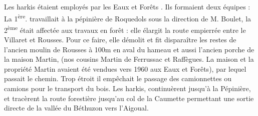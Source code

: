 Les harkis étaient employés par les \og Eaux et Forêts \fg{}. Ils formaient deux équipes :
La 1\textsuperscript{ère}. travaillait à la pépinière de Roquedols sous la direction de M. Boulet, la 2\textsuperscript{ème}
était affectée aux travaux en forêt : elle élargit la route empierrée entre le Villaret et
Rousses. Pour ce faire, elle démolit et fit disparaître les restes de l’ancien moulin de
Rousses à 100m en aval du hameau et aussi l’ancien porche de la maison Martin, (nos
cousins Martin de Ferrussac et Raffègues. La maison et la propriété Martin avaient été vendues vers
1960 aux Eaux et Forêts), par lequel passait le chemin. Trop étroit il empêchait le passage
des camionnettes ou camions pour le transport du bois.
Les harkis, continuèrent jusqu’à la Pépinière, et tracèrent la route forestière
jusqu’au col de la Caumette permettant une sortie directe de la vallée du Béthuzon vers
l’Aigoual.
